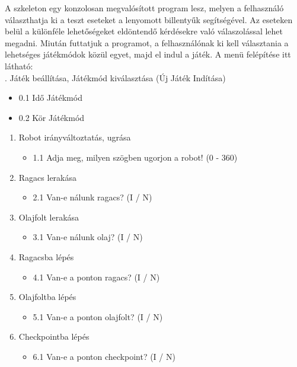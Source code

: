A szkeleton egy konzolosan megvalósított program lesz, melyen a felhasználó választhatja ki a teszt eseteket a lenyomott billentyűk segítségével. Az eseteken belül a különféle lehetőségeket eldöntendő kérdésekre való válaszolással lehet megadni.
Miután futtatjuk a programot, a felhasználónak ki kell választania a lehetséges játékmódok közül egyet, majd el indul a játék. A menü felépítése itt látható:\\


. Játék beállítása, Játékmód kiválasztása (Új Játék Indítása)
\begin{itemize}
\item 0.1 Idő Játékmód
\item 0.2 Kör Játékmód
\end{itemize} 
\begin{enumerate}
\item Robot irányváltoztatás, ugrása
\begin{itemize}
\item 1.1 Adja meg, milyen szögben ugorjon a robot! (0 - 360)
\end{itemize}
\item Ragacs lerakása
\begin{itemize}
\item 2.1 Van-e nálunk ragacs? (I / N)
\end{itemize}

\item Olajfolt lerakása
\begin{itemize}
\item 3.1 Van-e nálunk olaj? (I / N)
\end{itemize}

\item Ragacsba lépés
\begin{itemize}
\item 4.1 Van-e a ponton ragacs? (I / N)
\end{itemize}

\item Olajfoltba lépés
\begin{itemize}
\item 5.1 Van-e a ponton olajfolt? (I / N)
\end{itemize}

\item Checkpointba lépés
\begin{itemize}
\item 6.1 Van-e a ponton checkpoint? (I / N)
\end{itemize}


\end{enumerate}
